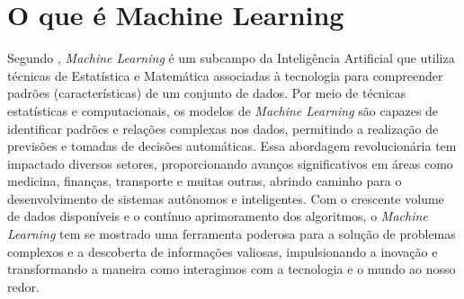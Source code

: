 \documentclass[12pt,oneside,a4paper,chapter=TITLE,
			   english,brazil]{abntex2}
\begin{document}
 


 \section{ O que é Machine Learning}

  Segundo , \textit{Machine Learning} é um subcampo da Inteligência Artificial que utiliza técnicas de Estatística e Matemática associadas à tecnologia para compreender padrões (características) de um conjunto de dados. Por meio de técnicas estatísticas e computacionais, os modelos de \textit{Machine Learning} são capazes de identificar padrões e relações complexas nos dados, permitindo a realização de previsões e tomadas de decisões automáticas. Essa abordagem revolucionária tem impactado diversos setores, proporcionando avanços significativos em áreas como medicina, finanças, transporte e muitas outras, abrindo caminho para o desenvolvimento de sistemas autônomos e inteligentes. Com o crescente volume de dados disponíveis e o contínuo aprimoramento dos algoritmos, o \textit{Machine Learning} tem se mostrado uma ferramenta poderosa para a solução de problemas complexos e a descoberta de informações valiosas, impulsionando a inovação e transformando a maneira como interagimos com a tecnologia e o mundo ao nosso redor. %
\end{document}
